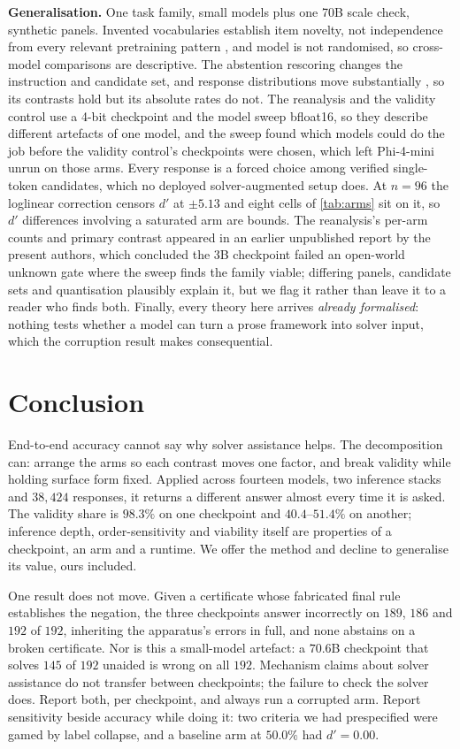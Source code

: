 \documentclass[10pt,twocolumn]{article}
\begin{document}
\textbf{Generalisation.} One task family, small models plus one 70B scale check,
synthetic panels.
Invented vocabularies establish item novelty, not independence from every
relevant pretraining pattern \citep{golchin2023time,deng2024investigating}, and
model is not randomised, so cross-model comparisons are descriptive. The
abstention rescoring changes the instruction and candidate set, and response
distributions move substantially \citep{zhao2021calibrate,zheng2023large}, so
its contrasts hold but its absolute rates do not. The reanalysis and the
validity control use a 4-bit checkpoint and the model sweep bfloat16, so they
describe different artefacts of one model, and the sweep found which models could
do the job before the validity control's checkpoints were chosen, which left
Phi-4-mini unrun on those arms. Every response is a forced choice among verified
single-token candidates, which no deployed solver-augmented setup does. At
$n = 96$ the loglinear correction censors $d'$ at $\pm 5.13$ and eight cells of
\cref{tab:arms} sit on it, so $d'$ differences involving a saturated arm are
bounds. The reanalysis's per-arm counts and primary contrast appeared in an
earlier unpublished report by the present authors, which concluded the 3B
checkpoint failed an open-world unknown gate where the sweep finds the family
viable; differing panels, candidate sets and quantisation plausibly explain it,
but we flag it rather than leave it to a reader who finds both. Finally, every
theory here arrives \emph{already formalised}: nothing tests whether a model can
turn a prose framework into solver input, which the corruption result makes
consequential.

\section{Conclusion}

End-to-end accuracy cannot say why solver assistance helps. The decomposition
can: arrange the arms so each contrast moves one factor, and break validity
while holding surface form fixed. Applied across fourteen models, two inference
stacks and $38{,}424$ responses, it returns a different answer almost
every time it is asked. The validity share is $98.3\%$ on one checkpoint and
$40.4$--$51.4\%$ on another; inference depth, order-sensitivity and viability
itself are properties of a checkpoint, an arm and a runtime. We offer the method
and decline to generalise its value, ours included.

One result does not move. Given a certificate whose fabricated final rule
establishes the negation, the three checkpoints answer incorrectly on $189$,
$186$ and $192$ of $192$, inheriting the apparatus's errors in full, and none
abstains on a broken certificate. Nor is this a small-model artefact: a $70.6$B
checkpoint that solves $145$ of $192$ unaided is wrong on all $192$. Mechanism claims about solver assistance do
not transfer between checkpoints; the failure to check the solver does. Report
both, per checkpoint, and always run a corrupted arm. Report sensitivity beside
accuracy while doing it: two criteria we had prespecified were gamed by label
collapse, and a baseline arm at $50.0\%$ had $d' = 0.00$.
\end{document}
